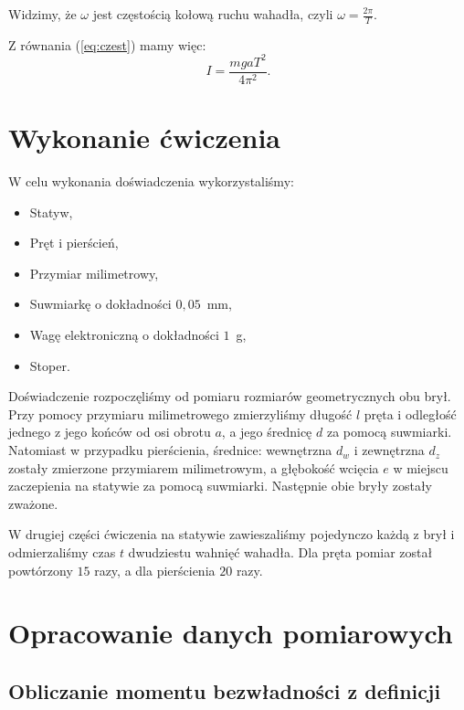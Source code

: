 \documentclass[12pt,a4paper]{article}
\numberwithin{equation}{section}
\begin{document}
Widzimy, że $\omega$ jest częstością kołową ruchu wahadła, czyli $\omega = \frac{2 \pi}{T}$.

Z równania (\ref{eq:czest}) mamy więc:
\begin{equation}
	I = \frac{mgaT^2}{4 \pi^2}.
	\label{eq:I}
\end{equation}

\section{Wykonanie ćwiczenia}
\label{sec:2}

W celu wykonania doświadczenia wykorzystaliśmy:
\begin{itemize}
	\item Statyw,
	\item Pręt i pierścień,
	\item Przymiar milimetrowy,
	\item Suwmiarkę o dokładności $0,05$~mm,
	\item Wagę elektroniczną o dokładności $1$~g,
	\item Stoper.
\end{itemize}

Doświadczenie rozpoczęliśmy od pomiaru rozmiarów geometrycznych obu brył. Przy pomocy przymiaru milimetrowego zmierzyliśmy długość $l$ pręta i odległość jednego z jego końców od osi obrotu $a$, a jego średnicę $d$ za pomocą suwmiarki. Natomiast w przypadku pierścienia, średnice: wewnętrzna $d_w$ i zewnętrzna $d_z$ zostały zmierzone przymiarem milimetrowym, a głębokość wcięcia $e$ w miejscu zaczepienia na statywie za pomocą suwmiarki. Następnie obie bryły zostały zważone.

W drugiej części ćwiczenia na statywie zawieszaliśmy pojedynczo każdą z brył i odmierzaliśmy czas $t$ dwudziestu wahnięć wahadła. Dla pręta pomiar został powtórzony $15$ razy, a dla pierścienia $20$ razy.

\pagebreak
\section{Opracowanie danych pomiarowych}
\subsection{Obliczanie momentu bezwładności z definicji}
\end{document}
